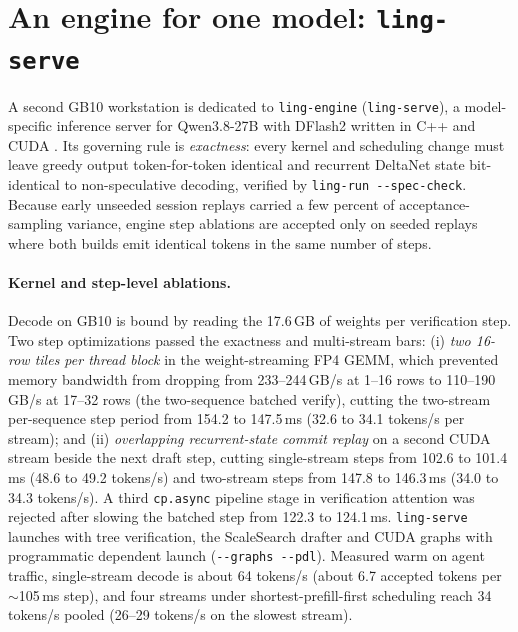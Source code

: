 \documentclass[11pt]{article}
\newcommand{\code}[1]{\texttt{#1}}
\begin{document}
\section{An engine for one model: \code{ling-serve}}
\label{sec:engine}

A second GB10 workstation is dedicated to \code{ling-engine} (\code{ling-serve}), a model-specific
inference server for Qwen3.8-27B with DFlash2 written in C++ and CUDA \cite{cudaguide}.
Its governing rule is \emph{exactness}: every kernel and scheduling change must leave greedy output
token-for-token identical and recurrent DeltaNet state bit-identical to non-speculative decoding,
verified by \code{ling-run -{}-spec-check}. Because early unseeded session replays carried a few
percent of acceptance-sampling variance, engine step ablations are accepted only on seeded replays
where both builds emit identical tokens in the same number of steps.

\paragraph{Kernel and step-level ablations.} Decode on GB10 is bound by reading the 17.6\,GB of
weights per verification step. Two step optimizations passed the exactness and multi-stream bars:
(i) \emph{two 16-row tiles per thread block} in the weight-streaming FP4 GEMM, which prevented
memory bandwidth from dropping from 233--244\,GB/s at 1--16 rows to 110--190\,GB/s at 17--32 rows
(the two-sequence batched verify), cutting the two-stream per-sequence step period from 154.2 to
147.5\,ms (32.6 to 34.1 tokens/s per stream); and (ii) \emph{overlapping recurrent-state commit
replay} on a second CUDA stream beside the next draft step, cutting single-stream steps from 102.6
to 101.4\,ms (48.6 to 49.2 tokens/s) and two-stream steps from 147.8 to 146.3\,ms (34.0 to 34.3
tokens/s). A third \code{cp.async} pipeline stage in verification attention was rejected after
slowing the batched step from 122.3 to 124.1\,ms. \code{ling-serve} launches with tree verification, the ScaleSearch
drafter and CUDA graphs with programmatic dependent launch (\code{-{}-graphs -{}-pdl}). Measured
warm on agent traffic, single-stream decode is about 64 tokens/s (about 6.7 accepted tokens per
$\sim$105\,ms step), and four streams under shortest-prefill-first scheduling reach 34 tokens/s
pooled (26--29 tokens/s on the slowest stream).
\end{document}
